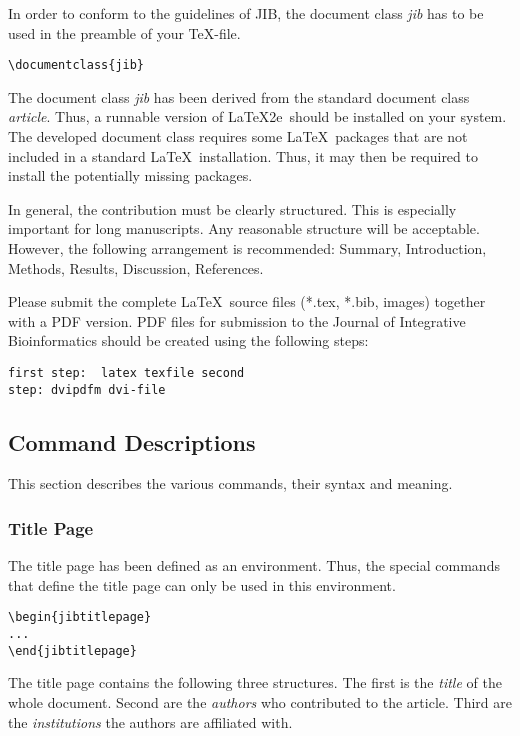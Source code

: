 \documentclass{jib}
\begin{document}
In order to conform to the guidelines of JIB, the document class \emph{jib} has
to be used in the preamble of your \TeX-file.

\begin{lstlisting}
\documentclass{jib}
\end{lstlisting}

The document class \emph{jib} has been derived from the standard document class
\emph{article}. Thus, a runnable version of \LaTeX2e\ should be installed on
your system. The developed document class requires some \LaTeX\ packages that
are not included in a standard \LaTeX\ installation. Thus, it may then be
required to install the potentially missing packages.

In general, the contribution must be clearly structured. This is especially
important for long manuscripts. Any reasonable structure will be acceptable.
However, the following arrangement is recommended: Summary, Introduction,
Methods, Results, Discussion, References.

Please submit the complete \LaTeX\ source files (*.tex, *.bib, images) together
with a PDF version. PDF files for submission to the Journal of Integrative
Bioinformatics should be created using the following steps:

\begin{lstlisting}[emph={texfile,dvi,file}] first step:  latex texfile second
step: dvipdfm dvi-file
\end{lstlisting}

\subsection{Command Descriptions}

This section describes the various commands, their syntax and meaning.

\subsubsection{Title Page}

The title page has been defined as an environment. Thus, the special commands
that define the title page can only be used in this environment.

\begin{lstlisting}
\begin{jibtitlepage}
...
\end{jibtitlepage}
\end{lstlisting}

The title page contains the following three structures. The first
is the \emph{title} of the whole document. Second are the
\emph{authors} who contributed to the article. Third are
the \emph{institutions} the authors are affiliated with.
\end{document}
